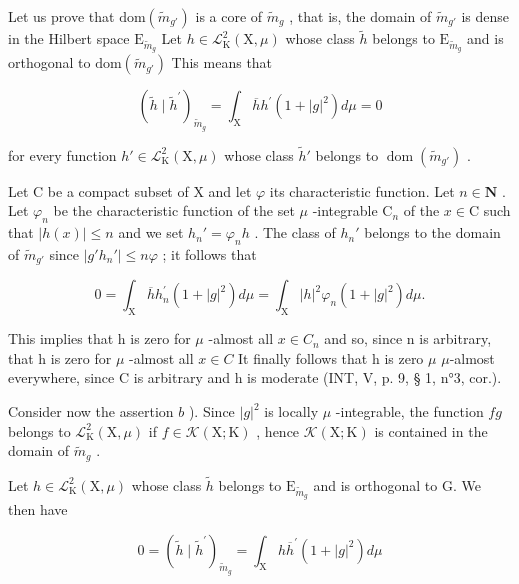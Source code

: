 Let us prove that \(\mathrm{dom}(\widetilde{m}_{g'})\) is a core of \(\widetilde{m}_g\) , that is, the domain of \(\widetilde{m}_{g'}\) is dense in the Hilbert space \(\mathrm{E}_{\widetilde{m}_g}\) Let \(h \in \mathcal{L}_{\mathrm{K}}^2(\mathrm{X}, \mu)\) whose class \(\widetilde{h}\) belongs to \(\mathrm{E}_{\widetilde{m}_g}\) and is orthogonal to \(\mathrm{dom}(\widetilde{m}_{g'})\) This means that

\[
(\widetilde {h} \mid \widetilde {h} ^ {\prime}) _ {\widetilde {m} _ {g}} = \int_ {\mathrm{X}} \overline {{h}} h ^ {\prime} (1 + | g | ^ {2}) d \mu = 0
\]

for every function \(h' \in \mathcal{L}_{\mathrm{K}}^{2}(\mathrm{X}, \mu)\) whose class \(\widetilde{h}'\) belongs to \(\operatorname{dom}(\widetilde{m}_{g'})\) .

Let C be a compact subset of X and let \(\varphi\) its characteristic function. Let \(n \in \mathbf{N}\) . Let \(\varphi_n\) be the characteristic function of the set \(\mu\) -integrable \(\mathrm{C}_n\) of the \(x \in \mathrm{C}\) such that \(|h(x)| \leqslant n\) and we set \(h_n' = \varphi_n h\) . The class of \(h_n'\) belongs to the domain of \(\tilde{m}_{g'}\) since \(|g'h_n'| \leqslant n\varphi\) ; it follows that

\[
0 = \int_ {\mathrm{X}} \overline {{h}} h _ {n} ^ {\prime} (1 + | g | ^ {2}) d \mu = \int_ {\mathrm{X}} | h | ^ {2} \varphi_ {n} (1 + | g | ^ {2}) d \mu .
\]

This implies that h is zero for \(\mu\) -almost all \(x \in C_{n}\) and so, since n is arbitrary, that h is zero for \(\mu\) -almost all \(x \in C\) It finally follows that h is zero \(\mu\) \(\mu\)-almost everywhere, since C is arbitrary and h is moderate (INT, V, p. 9, § 1, n°3, cor.).

Consider now the assertion \(b\) ). Since \(|g|^2\) is locally \(\mu\) -integrable, the function \(fg\) belongs to \(\mathcal{L}_{\mathrm{K}}^{2}(\mathrm{X},\mu)\) if \(f\in\mathcal{K}(\mathrm{X};\mathrm{K})\) , hence \(\mathcal{K}(\mathrm{X};\mathrm{K})\) is contained in the domain of \(\widetilde{m}_{g}\) .

Let \(h \in \mathcal{L}_{\mathrm{K}}^{2}(\mathrm{X}, \mu)\) whose class \(\widetilde{h}\) belongs to \(\mathrm{E}_{\widetilde{m}_{g}}\) and is orthogonal to G. We then have

\[
0 = (\widetilde {h} \mid \widetilde {h} ^ {\prime}) _ {\widetilde {m} _ {g}} = \int_ {\mathrm{X}} h \overline {{h}} ^ {\prime} (1 + | g | ^ {2}) d \mu
\]

